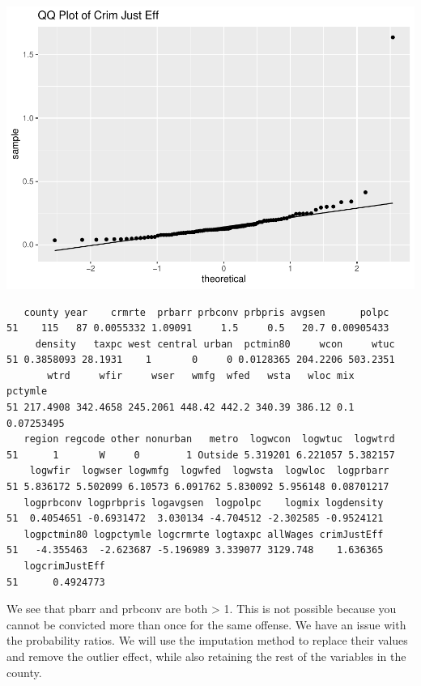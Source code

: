 \documentclass[]{article}
\newenvironment{Shaded}{}{}
\newcommand{\CommentTok}[1]{\textcolor[rgb]{0.00,0.50,0.00}{#1}}
\newcommand{\DecValTok}[1]{#1}
\newcommand{\NormalTok}[1]{#1}
\newcommand{\OperatorTok}[1]{#1}
\newcommand{\StringTok}[1]{\textcolor[rgb]{0.00,0.50,0.50}{#1}}
\begin{document}
\includegraphics{Bagnard_Gaustad_Hartman_Leung_Lab_3_files/figure-latex/unnamed-chunk-65-1.pdf}

\begin{Shaded}
\end{Shaded}

\begin{verbatim}
   county year    crmrte  prbarr prbconv prbpris avgsen      polpc
51    115   87 0.0055332 1.09091     1.5     0.5   20.7 0.00905433
     density   taxpc west central urban  pctmin80     wcon     wtuc
51 0.3858093 28.1931    1       0     0 0.0128365 204.2206 503.2351
       wtrd     wfir     wser   wmfg  wfed   wsta   wloc mix    pctymle
51 217.4908 342.4658 245.2061 448.42 442.2 340.39 386.12 0.1 0.07253495
   region regcode other nonurban   metro  logwcon  logwtuc  logwtrd
51      1       W     0        1 Outside 5.319201 6.221057 5.382157
    logwfir  logwser logwmfg  logwfed  logwsta  logwloc  logprbarr
51 5.836172 5.502099 6.10573 6.091762 5.830092 5.956148 0.08701217
   logprbconv logprbpris logavgsen  logpolpc    logmix logdensity
51  0.4054651 -0.6931472  3.030134 -4.704512 -2.302585 -0.9524121
   logpctmin80 logpctymle logcrmrte logtaxpc allWages crimJustEff
51   -4.355463  -2.623687 -5.196989 3.339077 3129.748    1.636365
   logcrimJustEff
51      0.4924773
\end{verbatim}

We see that pbarr and prbconv are both \textgreater{} 1. This is not
possible because you cannot be convicted more than once for the same
offense. We have an issue with the probability ratios. We will use the
imputation method to replace their values and remove the outlier effect,
while also retaining the rest of the variables in the county.
\end{document}
